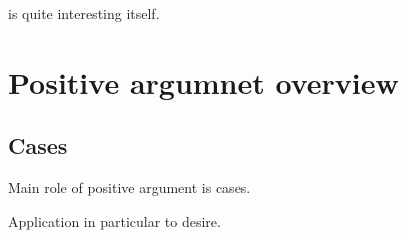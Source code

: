\begin{note}
  \mcB{} is quite interesting itself.
\end{note}

\section{Positive argumnet overview}
\label{sec:posit-argumn-overv}

\subsection{Cases}
\label{sec:cases}

\begin{note}
  Main role of positive argument is cases.
\end{note}

\begin{note}
  Application in particular to desire.
\end{note}